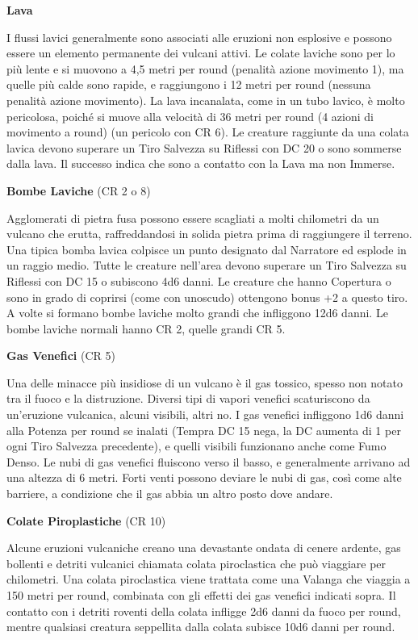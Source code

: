 \documentclass[a4paper,11pt,twoside,openany]{book}
\begin{document}
{\textbf{Lava}

I flussi lavici generalmente sono associati alle eruzioni non esplosive e possono essere un elemento permanente dei vulcani attivi. Le colate laviche sono per lo più lente e si muovono a 4,5 metri per round (penalità azione movimento 1), ma quelle più calde sono rapide, e raggiungono i 12 metri per round (nessuna penalità azione movimento). La lava incanalata, come in un tubo lavico, è molto pericolosa, poiché si muove alla velocità di 36 metri per round (4 azioni di movimento a round) (un pericolo con CR 6). Le creature raggiunte da una colata lavica devono superare un Tiro Salvezza su Riflessi con DC 20 o sono sommerse dalla lava. Il successo indica che sono a contatto con la Lava ma non Immerse.

\textbf{Bombe Laviche} (CR 2 o 8)

Agglomerati di pietra fusa possono essere scagliati a molti chilometri da un vulcano che erutta, raffreddandosi in solida pietra prima di raggiungere il terreno. Una tipica bomba lavica colpisce un punto designato dal Narratore ed esplode in un raggio medio. Tutte le creature nell'area devono superare un Tiro Salvezza su Riflessi con DC 15 o subiscono 4d6 danni. Le creature che hanno Copertura o sono in grado di coprirsi (come con uno­scudo) ottengono bonus +2 a questo tiro. A volte si formano bombe laviche molto grandi che infliggono 12d6 danni. Le bombe laviche normali hanno CR 2, quelle grandi CR 5.

\textbf{Gas Venefici} (CR 5)

Una delle minacce più insidiose di un vulcano è il gas tossico, spesso non notato tra il fuoco e la distruzione. Diversi tipi di vapori venefici scaturiscono da un'eruzione vulcanica, alcuni visibili, altri no. I gas venefici infliggono 1d6 danni alla Potenza per round se inalati (Tempra DC 15 nega, la DC aumenta di 1 per ogni Tiro Salvezza precedente), e quelli visibili funzionano anche come Fumo Denso. Le nubi di gas venefici fluiscono verso il basso, e generalmente arrivano ad una altezza di 6 metri. Forti venti possono deviare le nubi di gas, così come alte barriere, a condizione che il gas abbia un altro posto dove andare.

\textbf{Colate Piroplastiche} (CR 10)

Alcune eruzioni vulcaniche creano una devastante ondata di cenere ardente, gas bollenti e detriti vulcanici chiamata colata piroclastica che può viaggiare per chilometri. Una colata piroclastica viene trattata come una Valanga che viaggia a 150 metri per round, combinata con gli effetti dei gas venefici indicati sopra. Il contatto con i detriti roventi della colata infligge 2d6 danni da fuoco per round, mentre qualsiasi creatura seppellita dalla colata subisce 10d6 danni per round.

}
\end{document}
